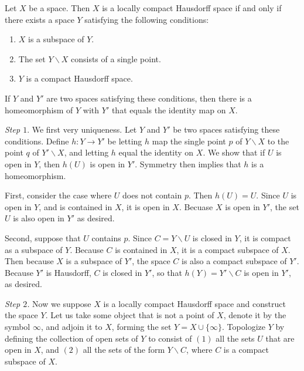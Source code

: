 \documentclass[12pt, a4paper, twoside, openright, titlepage]{book}
\begin{document}
\begin{thm}{}{}
    Let $X$ be a space. Then $X$ is a locally compact Hausdorff space if and only if there exists a space $Y$ satisfying the following conditions: \begin{enumerate}
        \item $X$ is a subspace of $Y$.
        \item The set $Y\backslash X$ consists of a single point.
        \item $Y$ is a compact Hausdorff space.
    \end{enumerate}
    If $Y$ and $Y'$ are two spaces satisfying these conditions, then there is a homeomorphism of $Y$ with $Y'$ that equals the identity map on $X$.
\end{thm}
\begin{proof*}{}{}
    \emph{Step $1.$} We first very uniqueness. Let $Y$ and $Y'$ be two spaces satisfying these conditions. Define $h:Y\rightarrow Y'$ be letting $h$ map the single point $p$ of $Y\backslash X$ to the point $q$ of $Y'\backslash X$, and letting $h$ equal the identity on $X$. We show that if $U$ is open in $Y$, then $h(U)$ is open in $Y'$. Symmetry then implies that $h$ is a homeomorphism.

    First, consider the case where $U$ does not contain $p$. Then $h(U) = U$. Since $U$ is open in $Y$, and is contained in $X$, it is open in $X$. Becuase $X$ is open in $Y'$, the set $U$ is also open in $Y'$ as desired.

    Second, suppose that $U$ contains $p$. Since $C = Y\backslash U$ is closed in $Y$, it is compact as a subspace of $Y$. Because $C$ is contained in $X$, it is a compact subspace of $X$. Then because $X$ is a subspace of $Y'$, the space $C$ is also a compact subspace of $Y'$. Because $Y'$ is Hausdorff, $C$ is closed in $Y'$, so that $h(Y) = Y'\backslash C$ is open in $Y'$, as desired.

    \emph{Step $2$.} Now we suppose $X$ is a locally compact Hausdorff space and construct the space $Y$. Let us take some object that is not a point of $X$, denote it by the symbol $\infty$, and adjoin it to $X$, forming the set $Y = X \cup \{\infty\}$. Topologize $Y$ by defining the collection of open sets of $Y$ to consist of $(1)$ all the sets $U$ that are open in $X$, and $(2)$ all the sets of the form $Y \backslash C$, where $C$ is a compact subspace of $X$.


\end{proof*}
\end{document}

